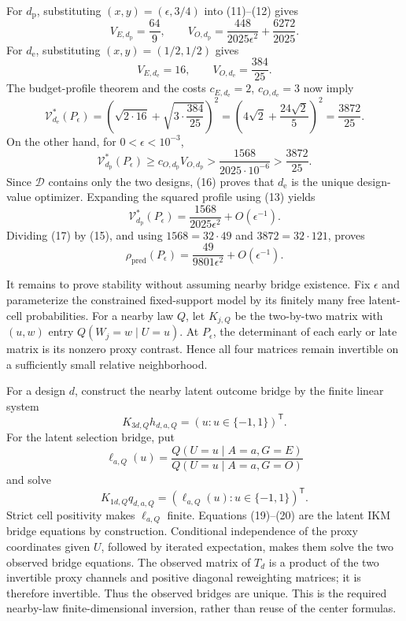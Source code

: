 For \(d_{\mathrm p}\), substituting \((x,y)=(\epsilon,3/4)\) into (11)--(12) gives
\[
 V_{E,d_{\mathrm p}}=\frac{64}{9},
 \qquad
 V_{O,d_{\mathrm p}}
 =\frac{448}{2025\epsilon^2}+\frac{6272}{2025}. \tag{13}
\]
For \(d_{\mathrm e}\), substituting \((x,y)=(1/2,1/2)\) gives
\[
 V_{E,d_{\mathrm e}}=16,
 \qquad
 V_{O,d_{\mathrm e}}=\frac{384}{25}. \tag{14}
\]
The budget-profile theorem and the costs \(c_{E,d_{\mathrm e}}=2\), \(c_{O,d_{\mathrm e}}=3\) now imply
\[
 \mathcal V_{d_{\mathrm e}}^*(P_\epsilon)
 =\left(\sqrt{2\cdot16}+\sqrt{3\cdot\frac{384}{25}}\right)^2
 =\left(4\sqrt2+\frac{24\sqrt2}{5}\right)^2
 =\frac{3872}{25}. \tag{15}
\]
On the other hand, for \(0<\epsilon<10^{-3}\),
\[
 \mathcal V_{d_{\mathrm p}}^*(P_\epsilon)
 \ge c_{O,d_{\mathrm p}}V_{O,d_{\mathrm p}}
 >\frac{1568}{2025\cdot10^{-6}}
 >\frac{3872}{25}. \tag{16}
\]
Since \(\mathcal D\) contains only the two designs, (16) proves that \(d_{\mathrm e}\) is the unique design-value optimizer.  Expanding the squared profile using (13) yields
\[
 \mathcal V_{d_{\mathrm p}}^*(P_\epsilon)
 =\frac{1568}{2025\epsilon^2}+O(\epsilon^{-1}). \tag{17}
\]
Dividing (17) by (15), and using \(1568=32\cdot49\) and \(3872=32\cdot121\), proves
\[
 \rho_{\mathrm{pred}}(P_\epsilon)
 =\frac{49}{9801\epsilon^2}+O(\epsilon^{-1}). \tag{18}
\]

It remains to prove stability without assuming nearby bridge existence.  Fix \(\epsilon\) and parameterize the constrained fixed-support model by its finitely many free latent-cell probabilities.  For a nearby law \(Q\), let \(K_{j,Q}\) be the two-by-two matrix with \((u,w)\) entry \(Q(W_j=w\mid U=u)\).  At \(P_\epsilon\), the determinant of each early or late matrix is its nonzero proxy contrast.  Hence all four matrices remain invertible on a sufficiently small relative neighborhood.

For a design \(d\), construct the nearby latent outcome bridge by the finite linear system
\[
 K_{3d,Q}h_{d,a,Q}=(u:u\in\{-1,1\})^{\mathsf T}. \tag{19}
\]
For the latent selection bridge, put
\[
 \ell_{a,Q}(u)=
 \frac{Q(U=u\mid A=a,G=E)}{Q(U=u\mid A=a,G=O)}
\]
and solve
\[
 K_{1d,Q}q_{d,a,Q}=(\ell_{a,Q}(u):u\in\{-1,1\})^{\mathsf T}. \tag{20}
\]
Strict cell positivity makes \(\ell_{a,Q}\) finite.  Equations (19)--(20) are the latent IKM bridge equations by construction.  Conditional independence of the proxy coordinates given \(U\), followed by iterated expectation, makes them solve the two observed bridge equations.  The observed matrix of \(T_d\) is a product of the two invertible proxy channels and positive diagonal reweighting matrices; it is therefore invertible.  Thus the observed bridges are unique.  This is the required nearby-law finite-dimensional inversion, rather than reuse of the center formulas.


